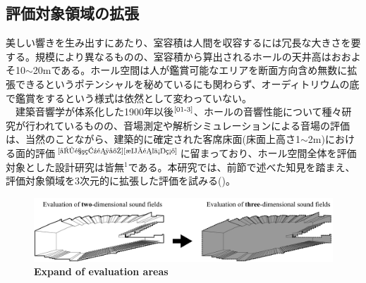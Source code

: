 \newpage
\subsection{評価対象領域の拡張}
美しい響きを生み出すにあたり、室容積は人間を収容するには冗長な大きさを要する。規模により異なるものの、室容積から算出されるホールの天井高はおおよそ10$\sim$20mである。ホール空間は人が鑑賞可能なエリアを断面方向含め無数に拡張できるというポテンシャルを秘めているにも関わらず、オーディトリウムの底で鑑賞をするという様式は依然として変わっていない。
\\　建築音響学が体系化した1900年以後$^{\text{\cite{01-3}}}$、ホールの音響性能について種々研究が行われているものの、音場測定や解析シミュレーションによる音場の評価は、当然のことながら、建築的に確定された客席床面(床面上高さ1$\sim$2m)における面的評価$^{\text{\cite{受音点選定}{\cite{最適位置}}}}$に留まっており、ホール空間全体を評価対象とした設計研究は皆無$^1$である。本研究では、前節で述べた知見を踏まえ、評価対象領域を3次元的に拡張した評価を試みる()。
\begin{figure}[htbp]
    \centering
    \includegraphics[keepaspectratio,scale=0.41]{01_att/evaluate_area.pdf}
    \caption{\hspace{1mm}\textbf{Expand of evaluation areas}}
    \label{fig:評価対象領域の拡張}
\end{figure}

\addtocounter{footnote}{1}

\pagebreak
